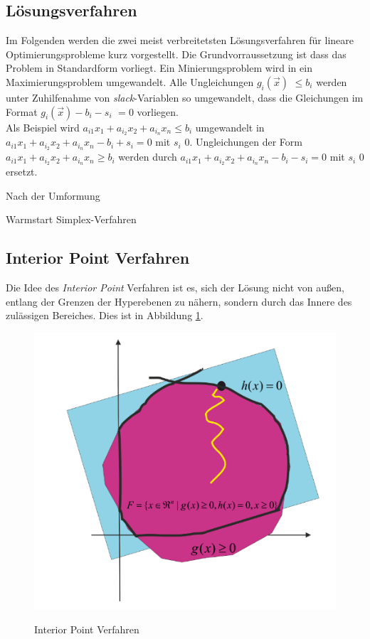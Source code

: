 \documentclass{like}
\begin{document}
 \subsection*{Lösungsverfahren}
 Im Folgenden werden die zwei meist verbreitetsten Lösungsverfahren für lineare Optimierungsprobleme kurz vorgestellt. 
 Die Grundvorraussetzung ist dass das Problem in Standardform vorliegt. Ein Minierungsproblem wird in ein Maximierungsproblem umgewandelt.
 Alle Ungleichungen $g_i(\vec{x})$ $\leq b_i$ werden unter Zuhilfenahme von \textit{slack}-Variablen so umgewandelt, dass die Gleichungen im Format $g_i(\vec{x}) - b_i -s_i$ $=  0$ vorliegen. \\
 Als Beispiel wird $a_{i1}x_1 + a_i_2 x_2 + a_i_n x_n\leq b_i$ umgewandelt in 
 $a_{i1}x_1 + a_i_2 x_2 + a_i_n x_n - b_i +s_i = 0$ mit \(s_i\) \geq \(0\).
 Ungleichungen der Form $a_{i1}x_1 + a_i_2 x_2 + a_i_n x_n\geq b_i$ werden  durch  
 $a_{i1}x_1 + a_i_2 x_2 + a_i_n x_n - b_i - s_i = 0$ mit \(s_i\) \geq \(0\) ersetzt.
 
 Nach der Umformung
 
 Warmstart
  Simplex-Verfahren
  
 \subsection*{Interior Point Verfahren}  
 Die Idee des \textit{Interior Point} Verfahren ist es, sich der Lösung nicht von außen, entlang der Grenzen der Hyperebenen zu nähern, sondern durch das Innere des zulässigen Bereiches. Dies ist in Abbildung \ref{fig:iterPoint}.
 
 \begin{figure}[ht!]
 	\caption{Interior Point Verfahren}
 	\includegraphics[width=350pt]{Abbildungen/iterPoint.png}
 	\label{fig:iterPoint}
 \end{figure}
\end{document}
